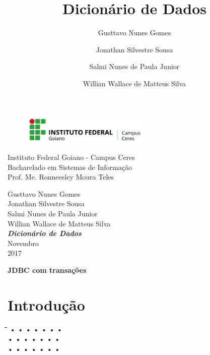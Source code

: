 \documentclass[12pt,a4paper]{article}
\title{Dicionário de Dados}
\author{Gusttavo Nunes Gomes\and Jonathan Silvestre Sousa \and Salmi Nunes de Paula Junior\and Willian Wallace de Matteus Silva}
\begin{document}
\begin{titlepage}
\begin{center}
\begin{figure}[htb]
                
                \label{figura:LogoIF}
        
                \centering
                \includegraphics[width=6cm]{recursos/imagens/logo.png} 
\end{figure}
Instituto Federal Goiano - Campus Ceres\\
Bacharelado em Sistemas de Informação\\
Prof. Me. Ronneesley Moura Teles\\\vspace{1cm}

Gusttavo Nunes Gomes\\
Jonathan Silvestre Sousa \\
Salmi Nunes de Paula Junior\\
Willian Wallace de Matteus Silva\\
\vspace{6.0cm}
\textit{\textbf{\Large{Dicionário de Dados}}}\\\vspace{11cm}
Novembro\\
2017\\
\end{center}
\end{titlepage}
\tableofcontents
\newpage
\begin{center}
\textbf{\Large{JDBC com transações}}\\\vspace{0.5cm}
\end{center}
\section{Introdução}

\begin{tabbing}
\hspace{1.0cm}\=\hspace{2cm}\=\hspace{0.5cm}\=\hspace{2cm}\=\hspace{2cm}\=\hspace{2cm}\=\kill
 • \>  • \>  • \>  • \>  • \>  • \> • \\ 
 • \>  • \>  • \>  • \>  • \>  • \> • \\ 
 • \>  • \>  • \>  • \>  • \>  • \> •
\end{tabbing} 
\end{document}
